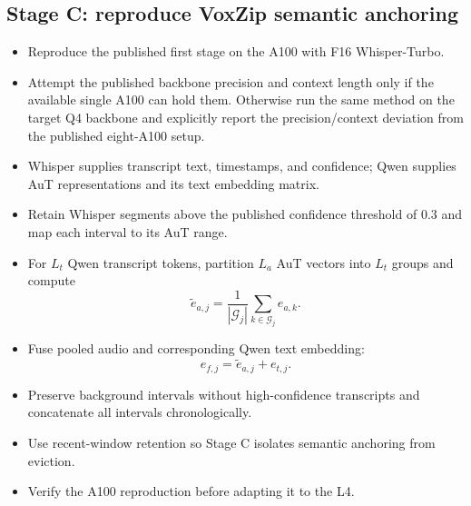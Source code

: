 \documentclass[10pt,letterpaper]{article}
\begin{document}
\subsection{Stage C: reproduce VoxZip semantic anchoring}
\begin{itemize}
    \item Reproduce the published first stage on the A100 with F16 Whisper-Turbo.
    \item Attempt the published backbone precision and context length only if the available single A100 can hold them. Otherwise run the same method on the target Q4 backbone and explicitly report the precision/context deviation from the published eight-A100 setup.
    \item Whisper supplies transcript text, timestamps, and confidence; Qwen supplies AuT representations and its text embedding matrix.
    \item Retain Whisper segments above the published confidence threshold of 0.3 and map each interval to its AuT range.
    \item For $L_t$ Qwen transcript tokens, partition $L_a$ AuT vectors into $L_t$ groups and compute
    \[
    \widetilde e_{a,j}=\frac{1}{|\mathcal G_j|}\sum_{k\in\mathcal G_j}e_{a,k}.
    \]
    \item Fuse pooled audio and corresponding Qwen text embedding:
    \[
    e_{f,j}=\widetilde e_{a,j}+e_{t,j}.
    \]
    \item Preserve background intervals without high-confidence transcripts and concatenate all intervals chronologically.
    \item Use recent-window retention so Stage C isolates semantic anchoring from eviction.
    \item Verify the A100 reproduction before adapting it to the L4.
\end{itemize}
\end{document}
